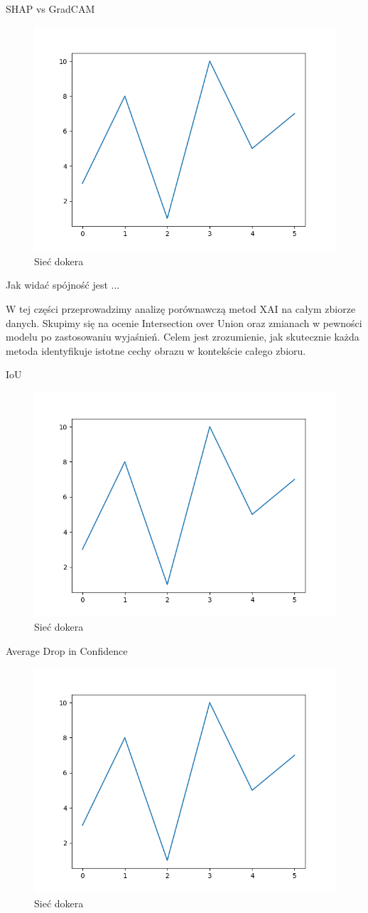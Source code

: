SHAP vs GradCAM
\begin{figure}
  \centering\includegraphics[width=.6\textwidth]{images/example}
\caption{Sieć dokera \cite{docker_compose_reference}}  \label{rys:network}
\end{figure}

Jak widać spójność jest ...

W tej części przeprowadzimy analizę porównawczą metod XAI na całym zbiorze danych.
Skupimy się na ocenie Intersection over Union oraz zmianach w pewności modelu po zastosowaniu wyjaśnień. Celem jest zrozumienie, jak skutecznie każda metoda identyfikuje istotne cechy obrazu w kontekście całego zbioru.

IoU
\begin{figure}
  \centering\includegraphics[width=.6\textwidth]{images/example}
\caption{Sieć dokera \cite{docker_compose_reference}}  \label{rys:network}
\end{figure}

Average Drop in Confidence
\begin{figure}
  \centering\includegraphics[width=.6\textwidth]{images/example}
\caption{Sieć dokera \cite{docker_compose_reference}}  \label{rys:network}
\end{figure}

